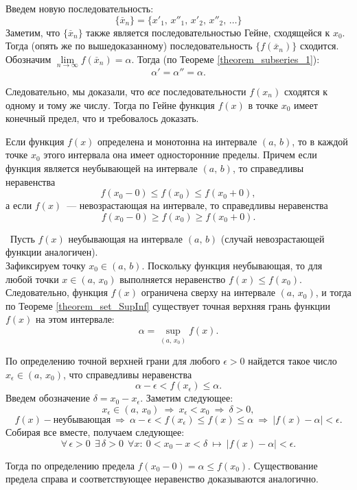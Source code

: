 \begin{theorem}
Введем новую последовательность:
\[
\{\overset{\_}{x}_{n}\} = \{x'_{1}, \, x''_{1}, \, x'_{2}, \, x''_{2}, \, \dots\}
\]
Заметим, что \(\{\overset{\_}{x}_{n}\}\) также является последовательностью Гейне,
сходящейся к \(x_{0}\).
Тогда (опять же по вышедоказанному) последовательность \(\{f(\overset{\_}{x}_{n})\}\) сходится.
Обозначим \(\lim\limits_{n \to \infty} f(\overset{\_}{x}_{n}) = \alpha\).
Тогда (по Теореме \ref{theorem_subseries_1}):
\[
\alpha' = \alpha'' = \alpha.
\]

Следовательно, мы доказали, что \textit{все} последовательности \(f(x_{n})\) сходятся
к одному и тому же числу. Тогда по Гейне функция \(f(x)\) в точке \(x_{0}\) имеет
конечный предел, что и требовалось доказать.~\qedsymbol
\end{theorem}


\begin{theorem}
Если функция \(f(x)\) определена и монотонна на интервале \((a, \, b)\), то в каждой точке
\(x_{0}\) этого интервала она имеет односторонние пределы. Причем если функция
является неубывающей на интервале \((a, \, b)\), то справедливы неравенства
\[
f(x_{0} - 0) \leq f(x_{0}) \leq f(x_{0} + 0),
\]
а если \(f(x)\)~--- невозрастающая на интервале, то справедливы неравенства
\[
f(x_{0} - 0) \geq f(x_{0}) \geq f(x_{0} + 0).
\]

\proofname~Пусть \(f(x)\) неубывающая на интервале \((a, \, b)\)
(случай невозрастающей функции аналогичен). \\
Зафиксируем точку \(x_{0} \in (a, \, b)\). Поскольку функция неубывающая,
то для любой точки \(x \in (a, \, x_{0})\) выполняется неравенство \(f(x) \leq f(x_{0})\).
Следовательно, функция \(f(x)\) ограничена сверху на интервале \((a, \, x_{0})\), и тогда
по Теореме \ref{theorem_set_SupInf} существует точная верхняя грань функции \(f(x)\)
на этом интервале:
\[
\alpha = \underset{(a, \, x_{0})}{\sup} f(x).
\]

По определению точной верхней грани для любого \(\epsilon > 0\) найдется такое число
\(x_{\epsilon} \in (a, \, x_{0})\), что справедливы неравенства
\[
\alpha - \epsilon < f(x_{\epsilon}) \leq \alpha.
\]
Введем обозначение \(\delta = x_{0} - x_{\epsilon}.\) Заметим следующее:
\[
x_{\epsilon} \in (a, \, x_{0}) ~ \Rightarrow ~ x_{\epsilon} < x_{0} ~ \Rightarrow ~ \delta > 0,
\]
\[
f(x) - \text{неубывающая} ~ \Rightarrow ~ \alpha - \epsilon < f(x_{\epsilon}) \leq f(x) \leq \alpha
~ \Rightarrow ~ |f(x) - \alpha| < \epsilon.
\]
Собирая все вместе, получаем следующее:
\[
\forall \, \epsilon > 0 ~~ \exists \, \delta > 0 ~~ \forall x: ~ 0 < x_{0} - x < \delta
~ \longmapsto ~ |f(x) - \alpha| < \epsilon.
\]

Тогда по определению предела \(f(x_{0} - 0) = \alpha \leq f(x_{0})\).
Существование предела справа и соответствующее неравенство доказываются аналогично.~\qedsymbol
\end{theorem}